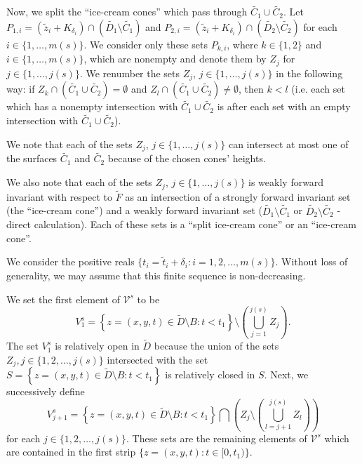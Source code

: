 \documentclass[a4paper]{article}
\begin{document}
Now, we split the ``ice-cream cones'' which pass through $\widetilde{C_1} \cup \widetilde{C_2}$. Let $P_{1,i}= \left(\widetilde{z}_i + K_{\delta_i}\right) \cap \left(\widetilde{D_1} \setminus \widetilde{C_1}\right)$ and $P_{2,i}= \left(\widetilde{z}_i + K_{\delta_i}\right) \cap \left(\widetilde{D_2} \setminus \widetilde{C_2}\right)$ for each $i \in \{1,\dots,m(s)\}$. We consider only these sets $P_{k,i}$, where $k \in \{1,2\}$ and $i \in \{1,\dots,m(s)\}$, which are nonempty and denote them by $Z_j$ for $j \in \{1,\dots,j(s)\}$. We renumber the sets $Z_j$, $j \in \{1,\dots,j(s)\}$ in the following way: if $Z_k \cap \left(\widetilde{C_1} \cup \widetilde{C_2}\right) = \emptyset$ and $Z_l \cap \left(\widetilde{C_1} \cup \widetilde{C_2}\right) \ne \emptyset$, then $k < l$ (i.e. each set which has a nonempty intersection with $\widetilde{C_1} \cup \widetilde{C_2}$ is after each set with an empty intersection with $\widetilde{C_1} \cup \widetilde{C_2}$).

We note that each of the sets $Z_j$, $j \in \{1,\dots,j(s)\}$ can intersect at most one of the surfaces $\widetilde{C_1}$ and $\widetilde{C_2}$ because of the chosen cones' heights.

We also note that each of the sets $Z_j$, $j \in \{1,\dots,j(s)\}$ is weakly forward invariant with respect to $\widetilde{F}$ as an intersection of a strongly forward invariant set (the ``ice-cream cone'') and a weakly forward invariant set ($\widetilde{D_1} \setminus \widetilde{C_1}$ or $\widetilde{D_2} \setminus \widetilde{C_2}$ - direct calculation). Each of these sets is a ``split ice-cream cone'' or an ``ice-cream cone''.

We consider the positive reals $\{t_i = \widetilde{t}_i + \delta_i : i = 1,2,\dots,m(s)\}$. Without loss of generality, we may assume that this finite sequence is non-decreasing.

We set the first element of $\mathcal{V}^s$ to be $$V^s_1 = \left\{z=(x,y,t) \in \widetilde{D} \setminus B : t<t_1\right\} \setminus \left(\bigcup_{j=1}^{j(s)} Z_{j}\right).$$
The set $V^s_1$ is relatively open in $\widetilde{D}$ because the union of the sets $Z_{j}, j \in \{1,2,\dots,j(s)\}$ intersected with the set $S=\left\{z=(x,y,t) \in \widetilde{D} \setminus B : t<t_1\right\}$ is relatively closed in $S$.
Next, we successively define $$V^s_{j+1} = \left\{z=(x,y,t) \in \widetilde{D} \setminus B : t<t_1\right\} \bigcap \left(Z_{j} \setminus \left(\bigcup_{l=j+1}^{j(s)} Z_{l}\right)\right)$$ for each $j \in \{1,2,\dots,j(s)\}$. These sets are the remaining elements of $\mathcal{V}^s$ which are contained in the first strip $\{z=(x,y,t) : t \in [0,t_1)\}$.
\end{document}
